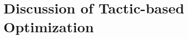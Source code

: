 \documentclass[preprint]{sigplanconf}
\newcommand{\greg}[1]{\textcolor{blue}{GREG: #1}}
\newcommand{\ltac}[0]{\ensuremath{\mathcal{L}_{\mathrm{tac}}}}
\begin{document}





\section{Discussion of Tactic-based Optimization}
\label{sec:discussion}
\end{document}
